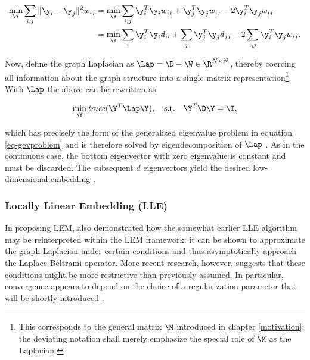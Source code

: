 \begin{equation*}
  \begin{split}
    \min_{\Y} \sum_{i, j} \| \y_i - \y_j \|^2 w_{ij}
    &= \min_{\Y} \sum_{i, j} \y_i^T \y_i w_{ij} + \y_j^T \y_j
    w_{ij} -
    2 \y_i^T \y_j w_{ij} \\
    &= \min_{\Y} \sum_i \y_i^T \y_i d_{ii} + \sum_j \y_j^T \y_j
    d_{jj} - 2 \sum_{i, j} \y_i^T \y_j w_{ij}.
  \end{split}
\end{equation*}

Now, define the graph Laplacian as
$\Lap = \D - \W \in \R^{N \times N}$, thereby coercing
all information about the graph structure into a single matrix
representation\footnote{
This corresponds to the general matrix $\M$ introduced in chapter
\ref{motivation}; the deviating notation shall merely emphasize the special
role of $\M$ as the Laplacian.}.
With $\Lap$ the above can be rewritten as

\begin{equation}
  \min_{\Y} \text{\textit{trace}}(\Y^T \Lap \Y), \quad \text{s.t.}
      \quad \Y^T \D \Y = \I,
  \label{eq-obj-lem}
\end{equation}

which has precisely the form of the generalized eigenvalue problem in equation
\ref{eq-gevproblem} and is therefore solved by eigendecomposition of $\Lap$ \citep{belkinniyogi2003}.
As in the continuous case, the bottom eigenvector with zero eigenvalue is
constant and must be discarded.
The subsequent $d$ eigenvectors yield the desired low-dimensional
embedding \citep{levy2006}.


\subsubsection{Locally Linear Embedding (LLE)}
\label{lle}

In proposing LEM, \citet{belkinniyogi2003} also demonstrated how the somewhat 
earlier LLE algorithm may be reinterpreted within the LEM framework: it can be 
shown to approximate the graph Laplacian under certain conditions and thus 
asymptotically approach the Laplace-Beltrami operator.
More recent research, however, suggests that these conditions might be more 
restrictive than previously assumed. 
In particular, convergence appears to depend on the choice of a regularization 
parameter that will be shortly introduced \citep{wuwu2018}.
\\

